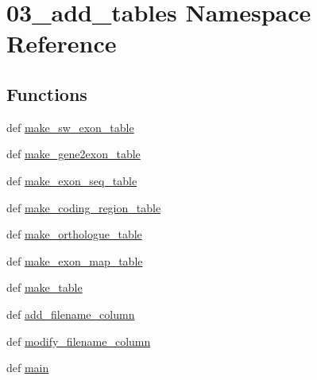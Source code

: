 \hypertarget{namespace03__add__tables}{\section{03\-\_\-add\-\_\-tables Namespace Reference}
\label{namespace03__add__tables}
}
\subsection*{Functions}
\begin{DoxyCompactItemize}
\item 
def \hyperlink{namespace03__add__tables_a740bee9cd0c629b13a5fa90f8c9a7f27}{make\-\_\-sw\-\_\-exon\-\_\-table}
\item 
def \hyperlink{namespace03__add__tables_a67df2b0308b2eb90922a01ce8032b2ff}{make\-\_\-gene2exon\-\_\-table}
\item 
def \hyperlink{namespace03__add__tables_a030ee0e65d19bd01789006fd5e5d5b6e}{make\-\_\-exon\-\_\-seq\-\_\-table}
\item 
def \hyperlink{namespace03__add__tables_afb2082750a06908cfe327689e01a86f8}{make\-\_\-coding\-\_\-region\-\_\-table}
\item 
def \hyperlink{namespace03__add__tables_addcbf63c5a65612191905ae349bec564}{make\-\_\-orthologue\-\_\-table}
\item 
def \hyperlink{namespace03__add__tables_a9c2ebd1d470b1572bbaa8c581f27d303}{make\-\_\-exon\-\_\-map\-\_\-table}
\item 
def \hyperlink{namespace03__add__tables_a1e4893148f49f238a1b6bcc517da9457}{make\-\_\-table}
\item 
def \hyperlink{namespace03__add__tables_aa69d20bb17702619c4190f824441c034}{add\-\_\-filename\-\_\-column}
\item 
def \hyperlink{namespace03__add__tables_a8c1a97a3f3fca589f2fca7a7e912c5cb}{modify\-\_\-filename\-\_\-column}
\item 
def \hyperlink{namespace03__add__tables_af33e16f5116c58412118ca70f9b7444e}{main}
\end{DoxyCompactItemize}


